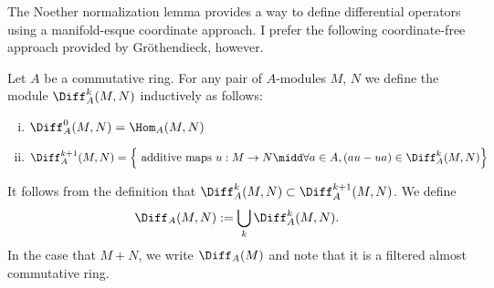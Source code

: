 \begin{rmk}\label{rmk:Noeth-Norm-gives-coord-def-of-diff-op}
	The Noether normalization lemma provides a way to define differential operators using a manifold-esque coordinate approach. I prefer the following coordinate-free approach provided by Gr\"othendieck, however.
\end{rmk}
\begin{defn}\label{defn:diff-ops}
	Let $A$ be a commutative ring. For any pair of $A$-modules $M$, $N$ we define the module $\Diff_A^{k}(M,N)$ inductively as follows:
	\begin{enumerate}[(i)]
		\item $\Diff_A^{0}(M,N) = \Hom_A(M,N)$
		\item $\Diff_A^{k+1}(M,N) = \left\{\text{ additive maps } u:M\to N \midd \forall a \in A, (a u - u a) \in \Diff^{k}_A(M,N)\right\}$
	\end{enumerate}
	It follows from the definition that $\Diff_{A}^{k}(M,N) \subset \Diff_A^{k+1}(M,N)$. We define
	\begin{align*}
		\Diff_A(M,N) := \bigcup_{k} \Diff_A^k(M,N).
	\end{align*}
	In the case that $M + N$, we write $\Diff_A(M)$ and note that it is a filtered almost commutative ring.
\end{defn}

